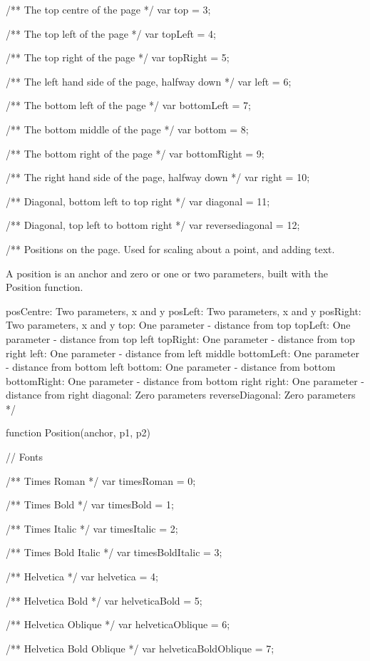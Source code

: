 /** The top centre of the page */
var top = 3;

/** The top left of the page */
var topLeft = 4;

/** The top right of the page */
var topRight = 5;

/** The left hand side of the page, halfway down */
var left = 6;

/** The bottom left of the page */
var bottomLeft = 7;

/** The bottom middle of the page */
var bottom = 8;

/** The bottom right of the page */
var bottomRight = 9;

/** The right hand side of the page, halfway down */
var right = 10;

/** Diagonal, bottom left to top right */
var diagonal = 11;

/** Diagonal, top left to bottom right */
var reversediagonal = 12;

/** Positions on the page. Used for scaling about a point, and adding text.

A position is an anchor and zero or one or two parameters, built with the
Position function.

posCentre: Two parameters, x and y
posLeft: Two parameters, x and y
posRight: Two parameters, x and y
top: One parameter - distance from top
topLeft: One parameter - distance from top left
topRight: One parameter - distance from top right
left: One parameter - distance from left middle
bottomLeft: One parameter - distance from bottom left
bottom: One parameter - distance from bottom
bottomRight: One parameter - distance from bottom right
right: One parameter - distance from right
diagonal: Zero parameters
reverseDiagonal: Zero parameters */

function Position(anchor, p1, p2)


// Fonts

/** Times Roman */
var timesRoman = 0;

/** Times Bold */
var timesBold = 1;

/** Times Italic */
var timesItalic = 2;

/** Times Bold Italic */
var timesBoldItalic = 3;

/** Helvetica */
var helvetica = 4;

/** Helvetica Bold */
var helveticaBold = 5;

/** Helvetica Oblique */
var helveticaOblique = 6;

/** Helvetica Bold Oblique */
var helveticaBoldOblique = 7;


